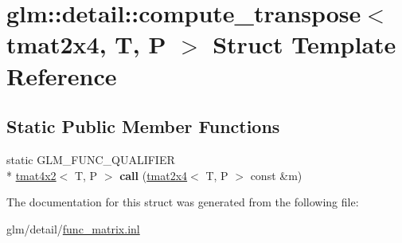 \hypertarget{structglm_1_1detail_1_1compute__transpose_3_01tmat2x4_00_01T_00_01P_01_4}{\section{glm\-:\-:detail\-:\-:compute\-\_\-transpose$<$ tmat2x4, T, P $>$ Struct Template Reference}
\label{structglm_1_1detail_1_1compute__transpose_3_01tmat2x4_00_01T_00_01P_01_4}
}
\subsection*{Static Public Member Functions}
\begin{DoxyCompactItemize}
\item 
\hypertarget{structglm_1_1detail_1_1compute__transpose_3_01tmat2x4_00_01T_00_01P_01_4_a3affd629f440bfc05cc8361fa7e2fc97}{static G\-L\-M\-\_\-\-F\-U\-N\-C\-\_\-\-Q\-U\-A\-L\-I\-F\-I\-E\-R \\*
\hyperlink{structglm_1_1tmat4x2}{tmat4x2}$<$ T, P $>$ {\bfseries call} (\hyperlink{structglm_1_1tmat2x4}{tmat2x4}$<$ T, P $>$ const \&m)}\label{structglm_1_1detail_1_1compute__transpose_3_01tmat2x4_00_01T_00_01P_01_4_a3affd629f440bfc05cc8361fa7e2fc97}

\end{DoxyCompactItemize}


The documentation for this struct was generated from the following file\-:\begin{DoxyCompactItemize}
\item 
glm/detail/\hyperlink{func__matrix_8inl}{func\-\_\-matrix.\-inl}\end{DoxyCompactItemize}
